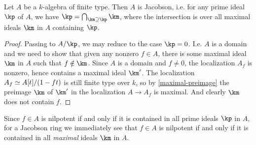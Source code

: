 \begin{lemma}
  \label{jacobson}
  Let $A$ be a $k$-algebra of finite type. Then $A$ is Jacobson, i.e. for any prime ideal $\kp$ of $A$, we have $\kp = \bigcap_{\km \supseteq \kp} \km$, where the intersection is over all maximal ideals $\km$ in $A$ containing $\kp$.

  \begin{proof}
    Passing to $A/\kp$, we may reduce to the case $\kp = 0$. I.e. $A$ is a domain and we need to show that given any nonzero $f \in A$, there is some maximal ideal $\km$ in $A$ such that $f \notin \km$. Since $A$ is a domain and $f \ne 0$, the localization $A_f$ is nonzero, hence contains a maximal ideal $\km'$. The localization $A_f \simeq A[t]/(1-ft)$ is still finite type over $k$, so by \cref{maximal-preimage} the preimage $\km$ of $\km'$ in the localization $A \to A_f$ is maximal. And clearly $\km$ does not contain $f$.
  \end{proof}

  \begin{subremark}
    \label{jacobson-nil}
    Since $f \in A$ is nilpotent if and only if it is contained in all prime ideals $\kp$ in $A$, for a Jacobson ring we immediately see that $f \in A$ is nilpotent if and only if it is contained in all \emph{maximal} ideals $\km$ in $A$.
  \end{subremark}
\end{lemma}



